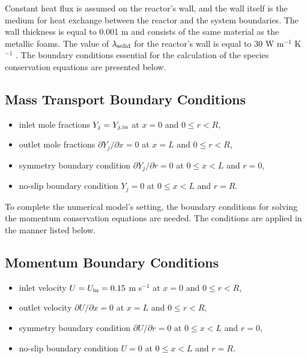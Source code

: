 \documentclass[preprint,12pt]{elsarticle}
\begin{document}
Constant heat flux is assumed on the reactor's wall, and the wall itself is the medium for heat exchange between the reactor and the system boundaries. The wall thickness is equal to 0.001 m and consists of the same material as the metallic foams. The value of $\lambda_{\rm{solid}}$ for the reactor's wall is equal to  30 W m$^{-1}$ K$^{-1}$ \cite{Peet2011}. The boundary conditions essential for the calculation of the species conservation equations are presented below. 

\subsection*{Mass Transport Boundary Conditions}
\begin{itemize}
  \item inlet mole fractions $Y_j = Y_{j,\rm{in}}$ \hspace*{\fill}  at $x = 0$ and $0 \leq r < R$,
  \item outlet mole fractions $\partial Y_j / \partial x = 0$ \hspace*{\fill} \hfill at $x = L$ and $0 \leq r < R$,
  \item symmetry boundary condition $\partial Y_j / \partial r = 0$ \hspace*{\fill} \hfill at $0 \leq x < L$ and $r = 0$,
  \item no-slip boundary condition $Y_j = 0$ \hspace*{\fill} \hfill at $0 \leq x < L$ and $r = R$.
\end{itemize}

To complete the numerical model's setting, the boundary conditions for solving the momentum conservation equations are needed. The conditions are applied in the manner listed below. 

\subsection*{Momentum Boundary Conditions}
\begin{itemize}
  \item inlet velocity $U = U_{\rm{in}} = 0.15$ m s$^{-1}$ \hspace*{\fill} \hfill at $x = 0$ and $0 \leq r < R$,
  \item outlet velocity $\partial U / \partial x = 0$ \hspace*{\fill} \hfill at $x = L$ and $0 \leq r < R$,
  \item symmetry boundary condition $\partial U / \partial r = 0$ \hspace*{\fill} \hfill at $0 \leq x < L$ and $r = 0$,
  \item no-slip boundary condition $U = 0$ \hspace*{\fill} \hfill at $0 \leq x < L$ and $r = R$.
\end{itemize}
\end{document}
